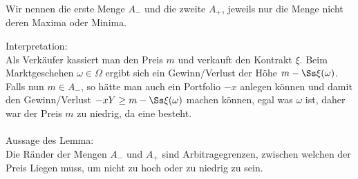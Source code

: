  	\begin{bemerkung}
 	 	Wir nennen die erste Menge $A_-$ und die zweite $A_+$, jeweils nur die Menge nicht deren Maxima oder Minima.
 	 \end{bemerkung}
 	 Interpretation: \\Als Verkäufer kassiert man den Preis $m$ und verkauft den Kontrakt $\xi$. Beim Marktgeschehen $\omega\in\Omega$ ergibt sich ein Gewinn/Verlust der Höhe $m-\Ss\xi(\omega)$. Falls nun $m\in A_-$, so hätte man auch ein Portfolio $-x$ anlegen können und damit den Gewinn/Verlust $-xY\ge m-\Ss\xi(\omega)$ machen können, egal was $\omega$ ist, daher war der Preis $m$ zu niedrig, da eine \am besteht.\\ \\
 	 Aussage des Lemma: \\ Die Ränder der Mengen $A_-$ und $A_+$ sind Arbitragegrenzen, zwischen welchen der Preis Liegen muss, um nicht zu hoch oder zu niedrig zu sein.
